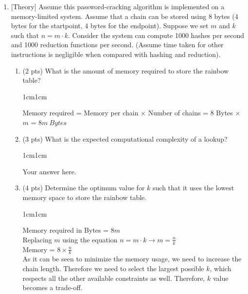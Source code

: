 \documentclass[11pt,letterpaper]{article}
\newenvironment{answer}{\em \color{blue} \begin{adjustwidth}{1cm}{1cm}}{\end{adjustwidth}}
\begin{document}
\begin{enumerate}
\begin{answer}
		\end{answer}
		
		\item $[$Theory$]$ Assume this password-cracking algorithm is implemented on a memory-limited system. Assume that a chain can be stored using 8 bytes (4 bytes for the startpoint, 4 bytes for the endpoint). Suppose we set $m$ and $k$ such that $n = m \cdot k$. Consider the system can compute 1000 hashes per second and 1000 reduction functions per second. (Assume time taken for other instructions is negligible when compared with hashing and reduction).
		
		\begin{enumerate}
			
			\item (2 pts) What is the amount of memory required to store the rainbow table?
			
			\begin{answer}
				
				Memory required = Memory per chain $\times$ Number of chains = 8 Bytes $\times$ $m$ = $8m~ Bytes$
				
			\end{answer}
			
			\item (3 pts) What is the expected computational complexity of a lookup?
			
			\begin{answer}
				
				Your answer here.
				
			\end{answer}
			
			\item (4 pts) Determine the optimum value for $k$ such that it uses the lowest memory space to store the rainbow table.
			
			\begin{answer}
				
				Memory required in Bytes = $8m$\\
				Replacing $m$ using the equation  $n = m \cdot k \rightarrow m = \frac{n}{k}$\\
				
				Memory = $8 \times \frac{n}{k}$\\
				
				As it can be seen to minimize the memory usage, we need to increase the chain length. Therefore we need to select the largest possible $k$, which respects all the other available constraints as well. Therefore, $k$ value becomes a trade-off.
				

\end{answer}
\end{enumerate}
\end{enumerate}
\end{document}
